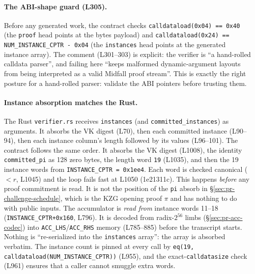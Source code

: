\paragraph{The ABI-shape guard (L305).}
Before any generated work, the contract checks
\texttt{calldataload(0x04) == 0x40} (the \texttt{proof} head
points at the bytes payload) and
\texttt{calldataload(0x24) == NUM\_\allowbreak{}INSTANCE\_\allowbreak{}CPTR - 0x04} (the
\texttt{instances} head points at the generated instance array).
The comment (L301--303) is explicit: the verifier is ``a hand-rolled calldata
parser'', and failing here ``keeps malformed dynamic-argument layouts
from being interpreted as a valid Midfall proof stream''. This
is exactly the right posture for a hand-rolled parser: validate
the ABI pointers before trusting them.

\paragraph{Instance absorption matches the Rust.}
The Rust \texttt{verifier.rs} receives \texttt{instances} (and
\texttt{committed\_\allowbreak{}instances}) as arguments. It absorbs the VK
digest (L70), then each committed instance (L90--94), then each
instance column's length followed by its values (L96--101). The
contract follows the same order. It absorbs the VK digest (L1008),
the identity \texttt{committed\_pi} as 128 zero bytes, the length
word \texttt{19} (L1035), and then the 19 instance words from
\texttt{INSTANCE\_\allowbreak{}CPTR = 0x1ee4}. Each word is checked canonical
($<r$, L1045) and the loop fails fast at L1050 (1e21311c). This
happens \emph{before} any proof commitment is read. It is not the
position of the \texttt{pi} absorb in
\S\ref{sec:pr-challenge-schedule}, which is the KZG opening proof
$\pi$ and has nothing to do with public inputs.
 The accumulator is \emph{read from} instance
words 11--18 (\texttt{INSTANCE\_\allowbreak{}CPTR+0x160}, L796). It is decoded
from radix-$2^{56}$ limbs (\S\ref{sec:pr-acc-codec}) into
\texttt{ACC\_LHS}/\texttt{ACC\_RHS} memory (L785--885) before the
transcript starts. Nothing is ``re-serialized into the
\texttt{instances} array'': the array is absorbed verbatim. The
instance count is pinned at every call by
\texttt{eq(19, calldataload(NUM\_\allowbreak{}INSTANCE\_\allowbreak{}CPTR))} (L955), and the
exact-\texttt{calldatasize} check (L961) ensures that a caller
cannot smuggle extra words.

